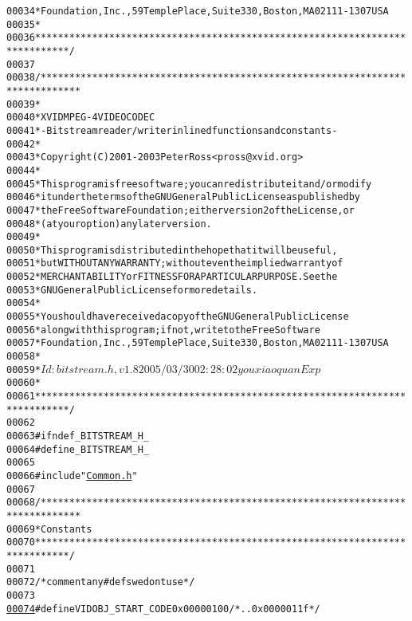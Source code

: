 \begin{footnotesize}
\begin{alltt}
00034 \textcolor{comment}{ *  Foundation, Inc., 59 Temple Place, Suite 330, Boston, MA  02111-1307 USA}
00035 \textcolor{comment}{ *}
00036 \textcolor{comment}{ ****************************************************************************/}
00037 
00038 \textcolor{comment}{/*****************************************************************************}
00039 \textcolor{comment}{ *}
00040 \textcolor{comment}{ *  XVID MPEG-4 VIDEO CODEC}
00041 \textcolor{comment}{ *  - Bitstream reader/writer inlined functions and constants-}
00042 \textcolor{comment}{ *}
00043 \textcolor{comment}{ *  Copyright (C) 2001-2003 Peter Ross <pross@xvid.org>}
00044 \textcolor{comment}{ *}
00045 \textcolor{comment}{ *  This program is free software ; you can redistribute it and/or modify}
00046 \textcolor{comment}{ *  it under the terms of the GNU General Public License as published by}
00047 \textcolor{comment}{ *  the Free Software Foundation ; either version 2 of the License, or}
00048 \textcolor{comment}{ *  (at your option) any later version.}
00049 \textcolor{comment}{ *}
00050 \textcolor{comment}{ *  This program is distributed in the hope that it will be useful,}
00051 \textcolor{comment}{ *  but WITHOUT ANY WARRANTY ; without even the implied warranty of}
00052 \textcolor{comment}{ *  MERCHANTABILITY or FITNESS FOR A PARTICULAR PURPOSE.  See the}
00053 \textcolor{comment}{ *  GNU General Public License for more details.}
00054 \textcolor{comment}{ *}
00055 \textcolor{comment}{ *  You should have received a copy of the GNU General Public License}
00056 \textcolor{comment}{ *  along with this program ; if not, write to the Free Software}
00057 \textcolor{comment}{ *  Foundation, Inc., 59 Temple Place, Suite 330, Boston, MA  02111-1307 USA}
00058 \textcolor{comment}{ *}
00059 \textcolor{comment}{ * $Id: bitstream.h,v 1.8 2005/03/30 02:28:02 youxiaoquan Exp $}
00060 \textcolor{comment}{ *}
00061 \textcolor{comment}{ ****************************************************************************/}
00062 
00063 \textcolor{preprocessor}{#ifndef \_BITSTREAM\_H\_}
00064 \textcolor{preprocessor}{}\textcolor{preprocessor}{#define \_BITSTREAM\_H\_}
00065 \textcolor{preprocessor}{}
00066 \textcolor{preprocessor}{#include "\hyperlink{_common_8h}{Common.h}"}
00067 
00068 \textcolor{comment}{/*****************************************************************************}
00069 \textcolor{comment}{ * Constants}
00070 \textcolor{comment}{ ****************************************************************************/}
00071 
00072 \textcolor{comment}{/* comment any #defs we dont use */}
00073 
\hypertarget{_bitstream_8h_source_l00074}{}\hyperlink{_bitstream_8h_abff7d25491a409504569e1dbfb4c8ff7}{00074} \textcolor{preprocessor}{#define VIDOBJ\_START\_CODE               0x00000100      }\textcolor{comment}{/* ..0x0000011f  */}

\end{alltt}
\end{footnotesize}

